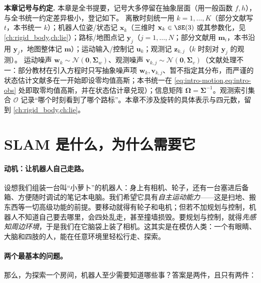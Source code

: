 \begin{note}
\textbf{本章记号与约定.}\;
本章是全书提要，记号大多停留在抽象层面（用一般函数 $f,h$），与全书统一约定差异极小，登记如下。
离散时刻统一用 $k=1,\dots,K$（部分文献写 $t$，本书统一 $k$）；机器人位姿/状态记 $\mathbf{x}_k$（三维时 $\mathbf{x}_k\in\SE(3)$ 或其参数化，见 \cref{ch:rigid_body,ch:lie}）；路标/地图点记 $\mathbf{y}_j$（$j=1,\dots,N$；部分文献用 $\mathbf{m}_i$，本书沿用 $\mathbf{y}_j$，地图整体记 $\mathbf{m}$）；运动输入/控制记 $\mathbf{u}_k$；观测记 $\mathbf{z}_{k,j}$（$k$ 时刻对 $\mathbf{y}_j$ 的观测）。
运动噪声 $\mathbf{w}_k\sim\mathcal{N}(\mathbf{0},\boldsymbol{\Sigma}_w)$、观测噪声 $\mathbf{v}_{k,j}\sim\mathcal{N}(\mathbf{0},\boldsymbol{\Sigma}_v)$（文献处理不一：部分教材在引入方程时只写抽象噪声项 $\mathbf{w}_k,\mathbf{v}_{k,j}$、暂不指定其分布\cite{gaoxiang2019slam14}，而严谨的状态估计文献多在一开始即设零均值高斯\cite{barfoot2024state,thrun2005probabilistic}；本书统一在 \cref{eq:intro-motion,eq:intro-obs} 处即取零均值高斯，并在状态估计章兑现）；信息矩阵 $\boldsymbol{\Omega}=\boldsymbol{\Sigma}^{-1}$。观测索引集合 $\mathcal{O}$ 记录“哪个时刻看到了哪个路标”。本章不涉及旋转的具体表示与四元数，留到 \cref{ch:rigid_body,ch:lie}。
\end{note}

\section{SLAM 是什么，为什么需要它}
\label{sec:intro-what}

\paragraph{动机：让机器人自己走路。}
设想我们组装一台叫“小萝卜”的机器人\cite{gaoxiang2019slam14}：身上有相机、轮子，还有一台塞进后备箱、方便随时调试的笔记本电脑。我们希望它具有\emph{自主运动能力}——这是扫地、搬东西等一切高级功能的前提。要移动就得有轮子和电机；但若不加规划与控制，机器人不知道自己要去哪里，会四处乱走，甚至撞墙损毁。要规划与控制，就得\emph{先感知周边环境}，于是我们在它脑袋上装了相机。这其实是在模仿人类：一个有眼睛、大脑和四肢的人，能在任意环境里轻松行走、探索。

\paragraph{两个最基本的问题。}
那么，为探索一个房间，机器人至少需要知道哪些事？答案是两件，且只有两件\cite{gaoxiang2019slam14}：

